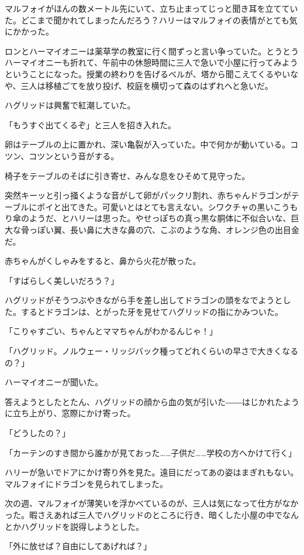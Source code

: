 \documentclass[10pt,a4paper]{article}
\begin{document}
\begin{CJK}{UTF8}{min}
マルフォイがほんの数メートル先にいて、立ち止まってじっと聞き耳を立てていた。どこまで聞かれてしまったんだろう？ハリーはマルフォイの表情がとても気にかかった。

ロンとハーマイオニーは薬草学の教室に行く間ずっと言い争っていた。とうとうハーマイオニーも折れて、午前中の休憩時間に三人で急いで小屋に行ってみようということになった。授業の終わりを告げるベルが、塔から聞こえてくるやいなや、三人は移植ごてを放り投げ、校庭を横切って森のはずれへと急いだ。

ハグリッドは興奮で紅潮していた。

「もうすぐ出てくるぞ」と三人を招き入れた。

卵はテーブルの上に置かれ、深い亀裂が入っていた。中で何かが動いている。コツン、コツンという音がする。

椅子をテーブルのそばに引き寄せ、みんな息をひそめて見守った。

突然キーッと引っ掻くような音がして卵がパックリ割れ、赤ちゃんドラゴンがテーブルにポイと出てきた。可愛いとはとても言えない。シワクチャの黒いこうもり傘のようだ、とハリーは思った。やせっぽちの真っ黒な胴体に不似合いな、巨大な骨っぽい翼、長い鼻に大きな鼻の穴、こぶのような角、オレンジ色の出目金だ。

赤ちゃんがくしゃみをすると、鼻から火花が散った。

「すばらしく美しいだろう？」

ハグリッドがそうつぶやきながら手を差し出してドラゴンの頭をなでようとした。するとドラゴンは、とがった牙を見せてハグリッドの指にかみついた。

「こりゃすごい、ちゃんとママちゃんがわかるんじゃ！」

「ハグリッド。ノルウェー・リッジバック種ってどれくらいの早さで大きくなるの？」

ハーマイオニーが聞いた。

答えようとしたとたん、ハグリッドの顔から血の気が引いた――はじかれたように立ち上がり、窓際にかけ寄った。

「どうしたの？」

「カーテンのすき間から誰かが見ておった……子供だ……学校の方へかけて行く」

ハリーが急いでドアにかけ寄り外を見た。遠目にだってあの姿はまぎれもない。マルフォイにドラゴンを見られてしまった。

次の週、マルフォイが薄笑いを浮かべているのが、三人は気になって仕方がなかった。暇さえあれば三人でハグリッドのところに行き、暗くした小屋の中でなんとかハグリッドを説得しようとした。

「外に放せば？自由にしてあげれば？」


\end{CJK}
\end{document}
